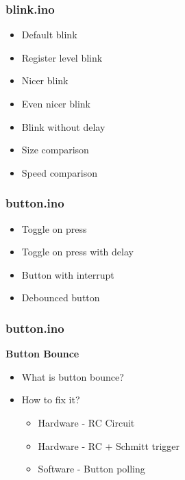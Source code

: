 \documentclass[t]{beamer}
\begin{document}
\begin{frame}[t]
\frametitle{blink.ino}
\begin{itemize}
	\item Default blink
	\item Register level blink
	\item Nicer blink
	\item Even nicer blink
	\item Blink without delay
	\item Size comparison
	\item Speed comparison  
\end{itemize}
\end{frame}


\begin{frame}[t]
\frametitle{button.ino}
\begin{itemize}
	\item Toggle on press
	\item Toggle on press with delay
	\item Button with interrupt
	\item Debounced button
\end{itemize}
\end{frame}


\begin{frame}[t]
\frametitle{button.ino}
\textbf{Button Bounce}
\begin{itemize}
	\item What is button bounce?
	\item How to fix it? 
	\begin{itemize}
		\item Hardware - RC Circuit
		\item Hardware - RC + Schmitt trigger
		\item Software - Button polling
	\end{itemize}
\end{itemize}
\end{frame}

\end{document}
